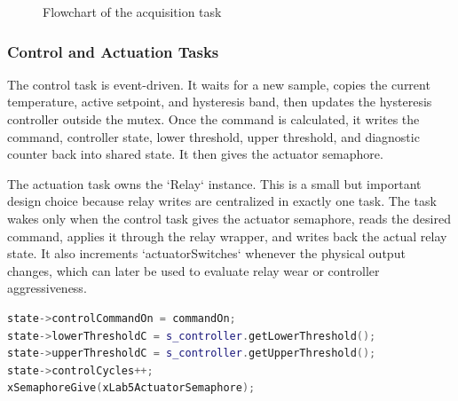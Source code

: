 \begin{figure}[H]
\centering
{}
\caption{Flowchart of the acquisition task}
\label{fig:acquisition_flowchart}
\end{figure}

\subsubsection{Control and Actuation Tasks}

The control task is event-driven. It waits for a new sample, copies the current temperature, active setpoint, and hysteresis band, then updates the hysteresis controller outside the mutex. Once the command is calculated, it writes the command, controller state, lower threshold, upper threshold, and diagnostic counter back into shared state. It then gives the actuator semaphore.

The actuation task owns the `Relay` instance. This is a small but important design choice because relay writes are centralized in exactly one task. The task wakes only when the control task gives the actuator semaphore, reads the desired command, applies it through the relay wrapper, and writes back the actual relay state. It also increments `actuatorSwitches` whenever the physical output changes, which can later be used to evaluate relay wear or controller aggressiveness.

\begin{lstlisting}[language=C++, caption=Control-to-actuation handoff, label=lst:control_actuation_handoff]
state->controlCommandOn = commandOn;
state->lowerThresholdC = s_controller.getLowerThreshold();
state->upperThresholdC = s_controller.getUpperThreshold();
state->controlCycles++;
xSemaphoreGive(xLab5ActuatorSemaphore);
\end{lstlisting}

